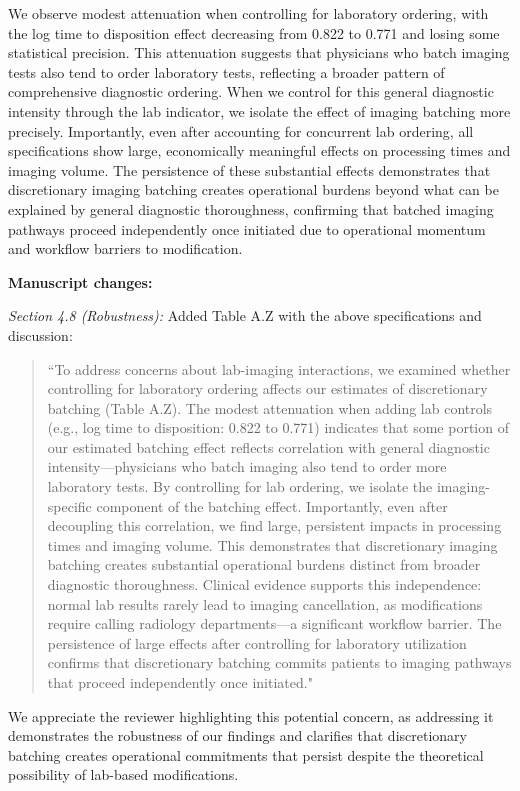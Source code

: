 \documentclass[11pt]{article}
\newcommand{\1}{\hbox{\rm 1\kern-.35em 1}}
\begin{document}
{{We observe modest attenuation when controlling for laboratory ordering, with the log time to disposition effect decreasing from 0.822 to 0.771 and losing some statistical precision. This attenuation suggests that physicians who batch imaging tests also tend to order laboratory tests, reflecting a broader pattern of comprehensive diagnostic ordering. When we control for this general diagnostic intensity through the lab indicator, we isolate the effect of imaging batching more precisely. Importantly, even after accounting for concurrent lab ordering, all specifications show large, economically meaningful effects on processing times and imaging volume. The persistence of these substantial effects demonstrates that discretionary imaging batching creates operational burdens beyond what can be explained by general diagnostic thoroughness, confirming that batched imaging pathways proceed independently once initiated due to operational momentum and workflow barriers to modification.

\textbf{Manuscript changes:}

\textit{Section 4.8 (Robustness):} Added Table A.Z with the above specifications and discussion:
\begin{quote}
``To address concerns about lab-imaging interactions, we examined whether controlling for laboratory ordering affects our estimates of discretionary batching (Table A.Z). The modest attenuation when adding lab controls (e.g., log time to disposition: 0.822 to 0.771) indicates that some portion of our estimated batching effect reflects correlation with general diagnostic intensity—physicians who batch imaging also tend to order more laboratory tests. By controlling for lab ordering, we isolate the imaging-specific component of the batching effect. Importantly, even after decoupling this correlation, we find large, persistent impacts in processing times and imaging volume. This demonstrates that discretionary imaging batching creates substantial operational burdens distinct from broader diagnostic thoroughness. Clinical evidence supports this independence: normal lab results rarely lead to imaging cancellation, as modifications require calling radiology departments—a significant workflow barrier. The persistence of large effects after controlling for laboratory utilization confirms that discretionary batching commits patients to imaging pathways that proceed independently once initiated."
\end{quote}

We appreciate the reviewer highlighting this potential concern, as addressing it demonstrates the robustness of our findings and clarifies that discretionary batching creates operational commitments that persist despite the theoretical possibility of lab-based modifications.

}}
\end{document}
